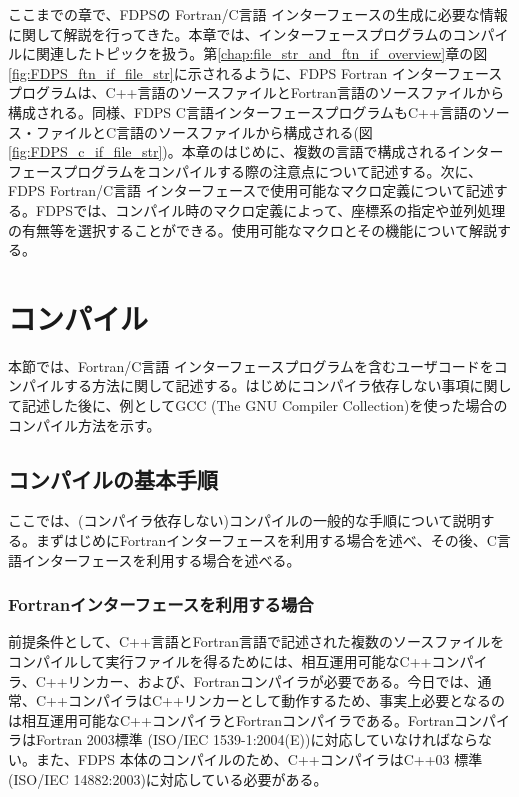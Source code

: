 ここまでの章で、FDPSの Fortran/C言語 インターフェースの生成に必要な情報に関して解説を行ってきた。本章では、インターフェースプログラムのコンパイルに関連したトピックを扱う。第\ref{chap:file_str_and_ftn_if_overview}章の図\ref{fig:FDPS_ftn_if_file_str}に示されるように、FDPS Fortran インターフェースプログラムは、C++言語のソースファイルとFortran言語のソースファイルから構成される。同様、FDPS C言語インターフェースプログラムもC++言語のソース・ファイルとC言語のソースファイルから構成される(図\ref{fig:FDPS_c_if_file_str})。本章のはじめに、複数の言語で構成されるインターフェースプログラムをコンパイルする際の注意点について記述する。次に、FDPS Fortran/C言語 インターフェースで使用可能なマクロ定義について記述する。FDPSでは、コンパイル時のマクロ定義によって、座標系の指定や並列処理の有無等を選択することができる。使用可能なマクロとその機能について解説する。


\section{コンパイル}
本節では、Fortran/C言語 インターフェースプログラムを含むユーザコードをコンパイルする方法に関して記述する。はじめにコンパイラ依存しない事項に関して記述した後に、例としてGCC (The GNU Compiler Collection)を使った場合のコンパイル方法を示す。
\subsection{コンパイルの基本手順}
\label{subsec:compile:basic_procedures}
ここでは、(コンパイラ依存しない)コンパイルの一般的な手順について説明する。まずはじめにFortranインターフェースを利用する場合を述べ、その後、C言語インターフェースを利用する場合を述べる。

\subsubsection{Fortranインターフェースを利用する場合}

前提条件として、C++言語とFortran言語で記述された複数のソースファイルをコンパイルして実行ファイルを得るためには、相互運用可能なC++コンパイラ、C++リンカー、および、Fortranコンパイラが必要である。今日では、通常、C++コンパイラはC++リンカーとして動作するため、事実上必要となるのは相互運用可能なC++コンパイラとFortranコンパイラである。FortranコンパイラはFortran 2003標準 (ISO/IEC 1539-1:2004(E))に対応していなければならない。また、FDPS 本体のコンパイルのため、C++コンパイラはC++03 標準(ISO/IEC 14882:2003)に対応している必要がある。

